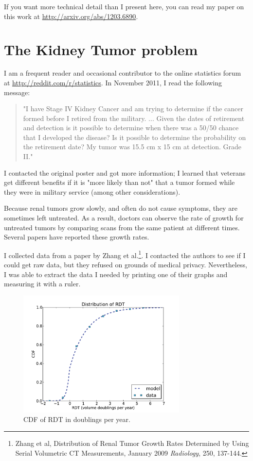 \documentclass[12pt]{book}
\begin{document}
If you want more technical detail than I present here, you can
read my paper on this work at \url{http://arxiv.org/abs/1203.6890}.


\section{The Kidney Tumor problem}

I am a frequent reader and occasional contributor to the online statistics
forum at \url{http://reddit.com/r/statistics}.  In November 2011, I read
the following message:

\begin{quote}
"I have Stage IV Kidney Cancer and am trying to determine if the
  cancer formed before I retired from the military. ... Given the
  dates of retirement and detection is it possible to determine when
  there was a 50/50 chance that I developed the disease? Is it
  possible to determine the probability on the retirement date?  My
  tumor was 15.5 cm x 15 cm at detection. Grade II."
\end{quote}

I contacted the original poster and got more information; I learned
that veterans get different benefits if it is "more likely than not"
that a tumor formed while they were in military service (among other
considerations).

Because renal tumors grow slowly, and often do not cause symptoms,
they are sometimes left untreated.  As a result, doctors can observe
the rate of growth for untreated tumors by comparing scans from the
same patient at different times.  Several papers have reported these
growth rates.

I collected data from a paper by Zhang et al.\footnote{Zhang et al,
  Distribution of Renal Tumor Growth Rates Determined by Using Serial
  Volumetric CT Measurements, January 2009 {\it Radiology}, 250,
  137-144.}.  I contacted the authors to see if I could get raw data,
but they refused on grounds of medical privacy.  Nevertheless, I was
able to extract the data I needed by printing one of their graphs and
measuring it with a ruler.

\begin{figure}
\centerline{\includegraphics[height=2.5in]{figs/kidney2.pdf}}
\caption{CDF of RDT in doublings per year.}
\label{fig.kidney2}
\end{figure}
\end{document}

